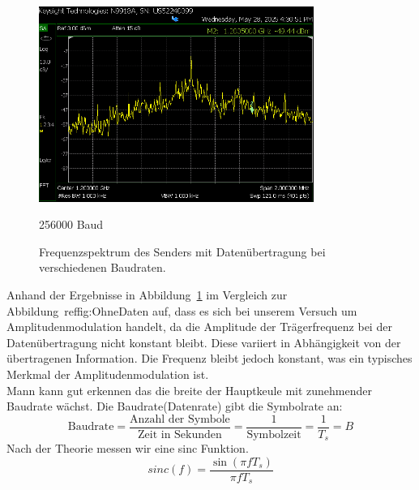 \begin{figure}[H]
        \vspace{0.5cm}
        \begin{minipage}{0.1\textwidth}
        \end{minipage}
        \hfill
        \begin{minipage}{0.47\textwidth}
            \centering
            \includegraphics[width=0.8\textwidth]{Pictures/4.4C.256000.png}
            \caption*{256000 Baud}
        \end{minipage}
        \hfill
        \begin{minipage}{0.1\textwidth}
        \end{minipage}

        \caption{Frequenzspektrum des Senders mit Datenübertragung bei verschiedenen Baudraten.}
        \label{fig:MitDaten}
    \end{figure}

Anhand der Ergebnisse in Abbildung~\ref{fig:MitDaten} im Vergleich zur Abbildung~ref{fig:OhneDaten} auf, dass es sich bei unserem Versuch um Amplitudenmodulation handelt, da die Amplitude der Trägerfrequenz bei der Datenübertragung nicht konstant bleibt. Diese variiert in Abhängigkeit von der übertragenen Information. Die Frequenz bleibt jedoch konstant, was ein typisches Merkmal der Amplitudenmodulation ist.
\\
Mann kann gut erkennen das die breite der Hauptkeule mit zunehmender Baudrate wächst.
Die Baudrate(Datenrate) gibt die Symbolrate an:
\begin{equation}
    \text{Baudrate} = \frac{\text{Anzahl der Symbole}}{\text{Zeit in Sekunden}}= \frac{1}{\text{Symbolzeit}}= \frac{1}{T_s} = B
\end{equation}
Nach der Theorie messen wir eine sinc Funktion.
\begin{equation}
    sinc(f) = \frac{\sin(\pi f T_s)}{\pi f T_s}
\end{equation}

